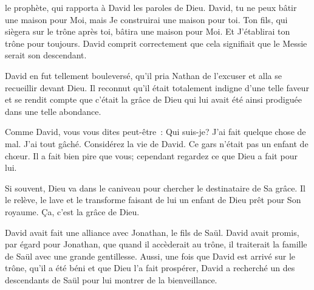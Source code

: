  le prophète, qui rapporta à David
 les paroles de Dieu.
 \og David, tu ne peux bâtir une maison pour Moi, mais Je construirai
 une maison pour toi.
 Ton fils, qui siègera sur le trône après toi, bâtira une maison pour Moi.
 Et J'établirai ton trône pour toujours. \fg{}
 David comprit correctement que cela signifiait
 que le Messie serait son descendant. 

David en fut tellement bouleversé, qu'il pria Nathan de l'excuser
 et alla se recueillir devant Dieu.
 Il reconnut qu'il était totalement indigne d'une telle faveur
 et se rendit compte que c'était la grâce de Dieu qui lui avait été ainsi
 prodiguée dans une telle abondance. 

Comme David, vous vous dites peut-être~:
 \og Qui suis-je? J'ai fait quelque chose de mal. J'ai tout gâché. \fg{}
 Considérez la vie de David. Ce gars n'était pas un enfant de ch\oe{}ur.
 Il a fait bien pire que vous; cependant regardez ce que Dieu a fait pour lui.


Si souvent, Dieu va dans le caniveau pour chercher le destinataire de Sa grâce.
 Il le relève, le lave et le transforme \ocadr faisant de lui un enfant de Dieu
 prêt pour Son royaume. Ça, c'est la grâce de Dieu. 

\dvrule






 David avait fait
 une alliance avec Jonathan, le fils de Saül.
 David avait promis, par égard pour Jonathan,
 que quand il accèderait au trône, il traiterait la famille de Saül
 avec une grande gentillesse.
 Aussi, une fois que David est arrivé sur le trône,
 qu'il a été béni et que Dieu l'a fait prospérer,
 David a recherché un des descendants de Saül
 pour lui montrer de la bienveillance. 

